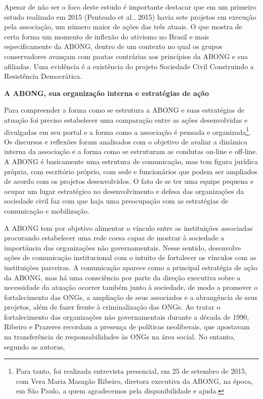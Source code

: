 Apesar de não ser o foco deste estudo é importante destacar que em um
primeiro estudo realizado em 2015 (Penteado et al., 2015) havia sete
projetos em execução pela associação, um número maior de ações das três
atuais. O que mostra de certa forma um momento de inflexão do ativismo
no Brasil e mais especificamente da ABONG, dentro de um contexto no qual
os grupos conservadores avançam com pautas contrárias aos princípios da
ABONG e sua afiliadas. Uma evidência é a existência do projeto Sociedade
Civil Construindo a Resistência Democrática.

\textbf{A ABONG, sua organização interna e estratégias de ação}

Para compreender a forma como se estrutura a ABONG e suas estratégias de
atuação foi preciso estabelecer uma comparação entre as ações
desenvolvidas e divulgadas em seu portal e a forma como a associação é
pensada e organizada\footnote{Para tanto, foi realizada entrevista
  presencial, em 25 de setembro de 2015, com Vera Maria Masagão Ribeiro,
  diretora executiva da ABONG, na época, em São Paulo, a quem
  agradecemos pela disponibilidade e ajuda.}. Os discursos e reflexões
foram analisados com o objetivo de avaliar a dinâmica interna da
associação e a forma como se estruturam as condutas on-line e off-line.
A ABONG é basicamente uma estrutura de comunicação, mas tem figura
jurídica própria, com escritório próprio, com sede e funcionários que
podem ser ampliados de acordo com os projetos desenvolvidos. O fato de
se ter uma equipe pequena e ocupar um lugar estratégico no
desenvolvimento e defesa das organizações da sociedade civil faz com que
haja uma preocupação com as estratégias de comunicação e mobilização.

A ABONG tem por objetivo alimentar o vínculo entre as instituições
associadas procurando estabelecer uma rede coesa capaz de mostrar à
sociedade a importância das organizações não governamentais. Nesse
sentido, desenvolve ações de comunicação institucional com o intuito de
fortalecer os vínculos com as instituições parceiras. A comunicação
aparece como a principal estratégia de ação da ABONG, mas há uma
consciência por parte da direção executiva sobre a necessidade da
atuação ocorrer também junto à sociedade, de modo a promover o
fortalecimento das ONGs, a ampliação de seus associados e a abrangência
de seus projetos, além de fazer frente à criminalização das ONGs. Ao
tratar o fortalecimento das organizações não governamentais durante a
década de 1990, Ribeiro e Prazeres recordam a presença de políticas
neoliberais, que apostavam na transferência de responsabilidades às ONGs
na área social. No entanto, segundo as autoras,

